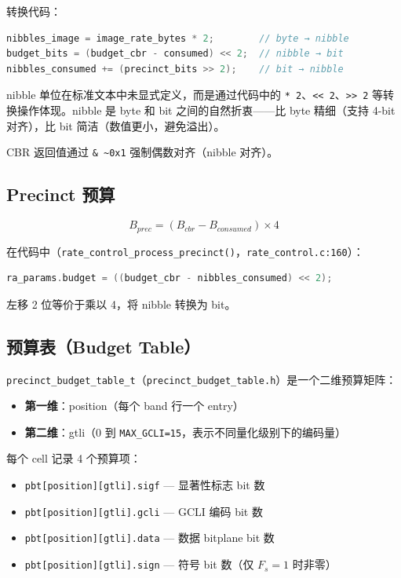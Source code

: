 转换代码：
\begin{lstlisting}[language=C,numbers=none]
nibbles_image = image_rate_bytes * 2;        // byte → nibble
budget_bits = (budget_cbr - consumed) << 2;  // nibble → bit
nibbles_consumed += (precinct_bits >> 2);    // bit → nibble
\end{lstlisting}

\begin{engineeringnote}
nibble 单位在标准文本中未显式定义，而是通过代码中的 \texttt{* 2}、\texttt{<< 2}、\texttt{>> 2} 等转换操作体现。nibble 是 byte 和 bit 之间的自然折衷——比 byte 精细（支持 4-bit 对齐），比 bit 简洁（数值更小，避免溢出）。

CBR 返回值通过 \texttt{\& \~{}0x1} 强制偶数对齐（nibble 对齐）。
\end{engineeringnote}

\subsection{Precinct 预算}

\begin{equation}\label{eq:prec-budget}
B_{\mathit{prec}} = (B_{\mathit{cbr}} - B_{\mathit{consumed}}) \times 4
\end{equation}

在代码中（\texttt{rate\_control\_process\_precinct()}，\texttt{rate\_control.c:160}）：

\begin{lstlisting}[language=C,numbers=none]
ra_params.budget = ((budget_cbr - nibbles_consumed) << 2);
\end{lstlisting}

左移 2 位等价于乘以 4，将 nibble 转换为 bit。

\subsection{预算表（Budget Table）}

\texttt{precinct\_budget\_table\_t}（\texttt{precinct\_budget\_table.h}）是一个二维预算矩阵：

\begin{itemize}
  \item \textbf{第一维}：position（每个 band 行一个 entry）
  \item \textbf{第二维}：gtli（0 到 \texttt{MAX\_GCLI=15}，表示不同量化级别下的编码量）
\end{itemize}

每个 cell 记录 4 个预算项：
\begin{itemize}
  \item \texttt{pbt[position][gtli].sigf} --- 显著性标志 bit 数
  \item \texttt{pbt[position][gtli].gcli} --- GCLI 编码 bit 数
  \item \texttt{pbt[position][gtli].data} --- 数据 bitplane bit 数
  \item \texttt{pbt[position][gtli].sign} --- 符号 bit 数（仅 $F_s=1$ 时非零）
\end{itemize}

